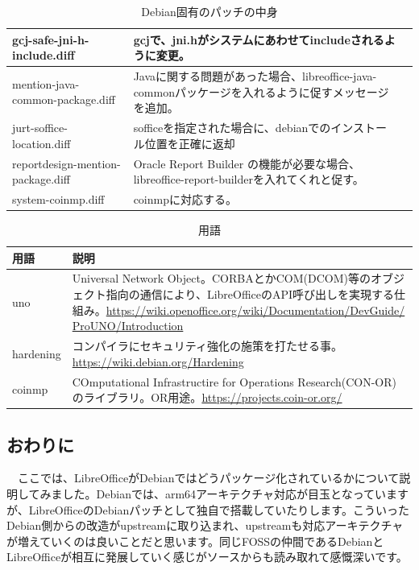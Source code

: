 \documentclass[mingoth,a4paper]{jsarticle}
\begin{document}
\begin{table}[ht]
\begin{center}
\begin{tabular}{|l|p{7cm}|p{3cm}|}
gcj-safe-jni-h-include.diff & gcjで、jni.hがシステムにあわせてincludeされるように変更。& \\ \hline
mention-java-common-package.diff & Javaに関する問題があった場合、libreoffice-java-commonパッケージを入れるように促すメッセージを追加。& \\ \hline
jurt-soffice-location.diff & sofficeを指定された場合に、debianでのインストール位置を正確に返却 & \\ \hline
reportdesign-mention-package.diff & Oracle Report Builder の機能が必要な場合、libreoffice-report-builderを入れてくれと促す。& \\ \hline
system-coinmp.diff & coinmpに対応する。 & \\ \hline
\end{tabular}
\end{center}
\caption{Debian固有のパッチの中身}
\label{tab:debian-specific-libreoffice-patches}
\end{table}

\begin{table}[ht]
\begin{center}
\small
\begin{tabular}{|l|p{10cm}|}
\hline
用語 & 説明 \\ \hline \hline
uno &  Universal Network Object。CORBAとかCOM(DCOM)等のオブジェクト指向の通信により、LibreOfficeのAPI呼び出しを実現する仕組み。\url{https://wiki.openoffice.org/wiki/Documentation/DevGuide/ ProUNO/Introduction} \\ \hline
hardening & コンパイラにセキュリティ強化の施策を打たせる事。\url{https://wiki.debian.org/Hardening} \\ \hline
coinmp & COmputational Infrastructire for Operations Research(CON-OR)のライブラリ。OR用途。\url{https://projects.coin-or.org/} \\ \hline
\end{tabular}
\end{center}
\caption{用語}
\label{tab:debian-specific-libreoffice-patches-usage}
\end{table}


\subsection{おわりに}

　ここでは、LibreOfficeがDebianではどうパッケージ化されているかについて説明してみました。Debianでは、arm64アーキテクチャ対応が目玉となっていますが、LibreOfficeのDebianパッチとして独自で搭載していたりします。こういったDebian側からの改造がupstreamに取り込まれ、upstreamも対応アーキテクチャが増えていくのは良いことだと思います。同じFOSSの仲間であるDebianとLibreOfficeが相互に発展していく感じがソースからも読み取れて感慨深いです。
 
\end{document}
